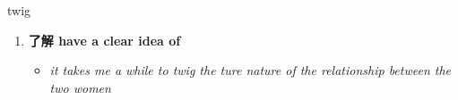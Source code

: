 
\begin{frame}
{\huge twig}
\begin{center}
\begin{enumerate}\Large
  \item \textbf{了解 have a clear idea of}
  \begin{itemize}
    \item \em{\Large{it takes me a while to twig the ture nature of the relationship between the two women}}
  \end{itemize}
\end{enumerate}
\end{center}
\end{frame}
